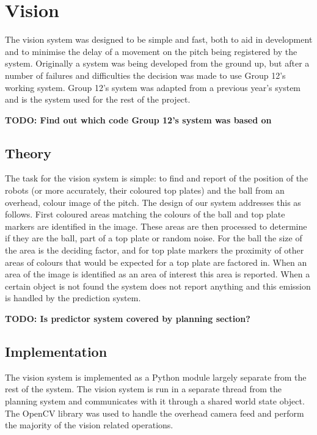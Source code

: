 \newcommand\visiontodo[1]{\textbf{TODO: #1}}

\section{Vision}

The vision system was designed to be simple and fast, both to aid in development and to minimise the delay of a movement on the
pitch being registered by the system. Originally a system was being developed from the ground up, but after a number of failures
and difficulties the decision was made to use Group 12's working system. Group 12's system was adapted from a previous year's
system and is the system used for the rest of the project.

\visiontodo{Find out which code Group 12's system was based on}

\subsection{Theory}

The task for the vision system is simple: to find and report of the position of the robots (or more accurately, their coloured
top plates) and the ball from an overhead, colour image of the pitch. The design of our system addresses this as follows. First
coloured areas matching the colours of the ball and top plate markers are identified in the image. These areas are then processed
to determine if they are the ball, part of a top plate or random noise. For the ball the size of the area is the deciding factor,
and for top plate markers the proximity of other areas of colours that would be expected for a top plate are factored in. When
an area of the image is identified as an area of interest this area is reported. When a certain object is not found the system
does not report anything and this emission is handled by the prediction system.

\visiontodo{Is predictor system covered by planning section?}

\subsection{Implementation}

The vision system is implemented as a Python module largely separate from the rest of the system. The vision system is run in
a separate thread from the planning system and communicates with it through a shared world state object. The OpenCV library
was used to handle the overhead camera feed and perform the majority of the vision related operations.

